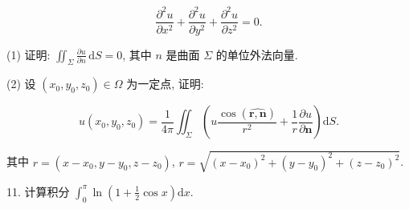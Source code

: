 \documentclass{examcollection}
\renewcommand{\displayformula}[1]{\[#1\]}
\begin{document}
{\begin{minipage}{\textwidth}
\displayformula{\frac {\partial^ {2} u}{\partial x ^ {2}} + \frac {\partial^ {2} u}{\partial y ^ {2}} + \frac {\partial^ {2} u}{\partial z ^ {2}} = 0.}\par
(1) 证明: $\iint_{\Sigma} \frac{\partial u}{\partial n} \, \mathrm{d}S = 0$, 其中 $n$ 是曲面 $\Sigma$ 的单位外法向量.\par
(2) 设 $(x_0, y_0, z_0) \in \Omega$ 为一定点, 证明:\par
\displayformula{u (x _ {0}, y _ {0}, z _ {0}) = \frac {1}{4 \pi} \iint_ {\Sigma} \left(u \frac {\cos (\widehat {\boldsymbol {r} , \boldsymbol {n}})}{r ^ {2}} + \frac {1}{r} \frac {\partial u}{\partial \boldsymbol {n}}\right) \mathrm{d} S.}\par
其中 $r = (x - x_0, y - y_0, z - z_0)$, $r = \sqrt{(x - x_0)^2 + (y - y_0)^2 + (z - z_0)^2}$.\par
11. 计算积分 $\int_0^\pi \ln \left(1 + \frac{1}{2}\cos x\right)\mathrm{d}x.$\par
\end{minipage}}
\ifdim\dimexpr\ht\proofbox+\dp\proofbox\relax>\textheight
\noindent\resizebox{!}{\textheight}{\usebox{\proofbox}}\else\noindent\usebox{\proofbox}\fi\clearpage
\end{document}
